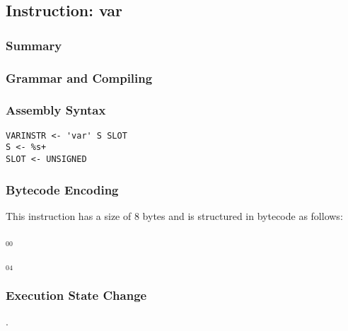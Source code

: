 \subsection{Instruction: var}

\subsubsection{Summary}


\subsubsection{Grammar and Compiling}


\subsubsection{Assembly Syntax}

\begin{myquote}
\begin{verbatim}
VARINSTR <- 'var' S SLOT
S <- %s+
SLOT <- UNSIGNED
\end{verbatim}
\end{myquote}


\subsubsection{Bytecode Encoding}

This instruction has a size of 8 bytes and is structured in bytecode as follows:

$_{00}$\ 



$_{04}$\ 


\subsubsection{Execution State Change}

.


